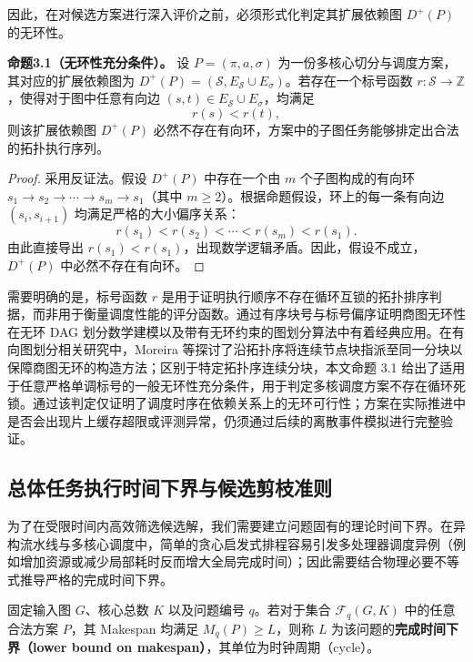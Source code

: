 \documentclass[anonymous,withtoc]{gmcm2026}
\begin{document}
因此，在对候选方案进行深入评价之前，必须形式化判定其扩展依赖图 \(D^+(P)\) 的无环性。

\textbf{命题3.1（无环性充分条件）。} 设 \(P = (\pi, a, \sigma)\) 为一份多核心切分与调度方案，其对应的扩展依赖图为 \(D^+(P) = (\mathcal{S}, E_{\mathcal{S}} \cup E_\sigma)\)。若存在一个标号函数 \(r: \mathcal{S} \to \mathbb{Z}\)，使得对于图中任意有向边 \((s, t) \in E_{\mathcal{S}} \cup E_\sigma\)，均满足 \begin{equation}
r(s) < r(t),
\end{equation} 则该扩展依赖图 \(D^+(P)\) 必然不存在有向环，方案中的子图任务能够排定出合法的拓扑执行序列。

\begin{proof} 采用反证法。假设 \(D^+(P)\) 中存在一个由 \(m\) 个子图构成的有向环 \(s_1 \to s_2 \to \cdots \to s_m \to s_1\)（其中 \(m \ge 2\)）。根据命题假设，环上的每一条有向边 \((s_i, s_{i+1})\) 均满足严格的大小偏序关系： \begin{equation}
r(s_1) < r(s_2) < \cdots < r(s_m) < r(s_1).
\end{equation} 由此直接导出 \(r(s_1) < r(s_1)\)，出现数学逻辑矛盾。因此，假设不成立，\(D^+(P)\) 中必然不存在有向环。 \end{proof}

需要明确的是，标号函数 \(r\) 是用于证明执行顺序不存在循环互锁的拓扑排序判据，而非用于衡量调度性能的评分函数。通过有序块号与标号偏序证明商图无环性在无环 DAG 划分数学建模\cite{ref7}以及带有无环约束的图划分算法\cite{ref18}中有着经典应用。在有向图划分相关研究中，Moreira 等\cite{ref18}探讨了沿拓扑序将连续节点块指派至同一分块以保障商图无环的构造方法；区别于特定拓扑序连续分块，本文命题 3.1 给出了适用于任意严格单调标号的一般无环性充分条件，用于判定多核调度方案不存在循环死锁。通过该判定仅证明了调度时序在依赖关系上的无环可行性；方案在实际推进中是否会出现片上缓存超限或评测异常，仍须通过后续的离散事件模拟进行完整验证。

\subsection{总体任务执行时间下界与候选剪枝准则}

为了在受限时间内高效筛选候选解，我们需要建立问题固有的理论时间下界。在异构流水线与多核心调度中，简单的贪心启发式排程容易引发多处理器调度异例（例如增加资源或减少局部耗时反而增大全局完成时间）\cite{ref2}；因此需要结合物理必要不等式推导严格的完成时间下界。

固定输入图 \(G\)、核心总数 \(K\) 以及问题编号 \(q\)。若对于集合 \(\mathcal{F}_q(G, K)\) 中的任意合法方案 \(P\)，其 Makespan 均满足 \(M_q(P) \ge L\)，则称 \(L\) 为该问题的\textbf{完成时间下界（lower bound on makespan）}，其单位为时钟周期（cycle）。
\end{document}
